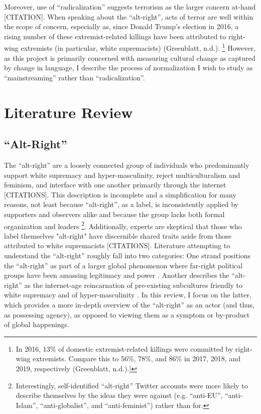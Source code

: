 \documentclass[acmlarge, screen, authorversion]{acmart}
\begin{document}
Moreover, use of “radicalization” suggests terrorism as the larger
concern at-hand [CITATION]. When speaking about the “alt-right”, acts of
terror are well within the scope of concern, especially as, since Donald
Trump’s election in 2016, a rising number of these extremist-related
killings have been attributed to right-wing extremists (in particular,
white supremacists) (Greenblatt, n.d.). \footnote{In 2016, 13\% of domestic extremist-related
killings were committed by right-wing extremists. Compare this to 56\%,
78\%, and 86\% in 2017, 2018, and 2019, respectively (Greenblatt, n.d.).]
} However, as this project is primarily concerned with
measuring cultural change as captured by change in language, I describe
the process of normalization I wish to study as “mainstreaming” rather
than “radicalization”.

\section{Literature Review}

\subsection{``Alt-Right''}

The ``alt-right” are a loosely connected group of individuals who predominantly support white supremacy and hyper-masculinity, reject multiculturalism and feminism, and interface with one another primarily through the internet
[CITATIONS]. This description is incomplete and a simplification for
many reasons, not least because ``alt-right'', as a label, is inconsistently applied by supporters and observers alike and because the group lacks both formal organization and leaders \cite{hawleyMakingSenseAltright2017} \footnote{Interestingly, self-identified “alt-right” Twitter accounts
were more likely to describe themselves by the ideas they were against
(e.g. “anti-EU”, “anti-Islam”, “anti-globalist”, and “anti-feminist”)
rather than for.}. Additionally, experts are skeptical that those who label themselves "alt-right" have discernible shared traits aside from those attributed to white supremacists
[CITATIONS]. Literature attempting to understand the ``alt-right” roughly fall into two categories: One strand positions the ``alt-right'' as part
of a larger global phenomenon where far-right political groups have been
amassing legitimacy and power \cite{worthMorbidSymptomsGlobal2019}. Another describes the
``alt-right” as the internet-age reincarnation of pre-existing subcultures friendly to white supremacy and of hyper-masculinity
\cite{hawleyMakingSenseAltright2017, mainRiseAltRight2018}. In this review,
I focus on the latter, which provides a more in-depth overview of the ``alt-right'' as an actor (and thus, as possessing agency), as opposed to viewing them as a symptom or by-product of global happenings.
\end{document}
